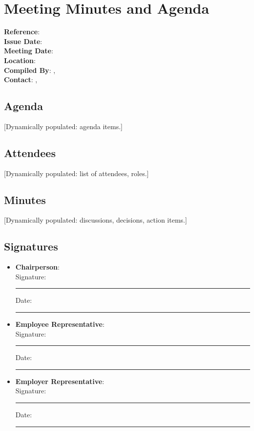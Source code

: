 \documentclass[11pt]{article}
\newcommand{\docTitle}{Meeting Minutes and Agenda}
\newcommand{\refNumber}{}
\newcommand{\issueDate}{}
\newcommand{\meetingDate}{}
\newcommand{\meetingLocation}{}
\newcommand{\compilerName}{}
\newcommand{\compilerRole}{}
\newcommand{\compilerEmail}{}
\newcommand{\compilerPhone}{}
\newcommand{\chairpersonName}{}
\newcommand{\employeeRepName}{}
\newcommand{\employerRepName}{}
\begin{document}
\section*{\docTitle}
\textbf{Reference}: \refNumber \\
\textbf{Issue Date}: \issueDate \\
\textbf{Meeting Date}: \meetingDate \\
\textbf{Location}: \meetingLocation \\
\textbf{Compiled By}: \compilerName, \compilerRole \\
\textbf{Contact}: \compilerEmail, \compilerPhone

\subsection*{Agenda}
[Dynamically populated: agenda items.]

\subsection*{Attendees}
[Dynamically populated: list of attendees, roles.]

\subsection*{Minutes}
[Dynamically populated: discussions, decisions, action items.]

\subsection*{Signatures}
\begin{itemize}
  \item \textbf{Chairperson}: \chairpersonName \\
    Signature: \rule{5cm}{0.4pt} \quad Date: \rule{3cm}{0.4pt}
  \item \textbf{Employee Representative}: \employeeRepName \\
    Signature: \rule{5cm}{0.4pt} \quad Date: \rule{3cm}{0.4pt}
  \item \textbf{Employer Representative}: \employerRepName \\
    Signature: \rule{5cm}{0.4pt} \quad Date: \rule{3cm}{0.4pt}
\end{itemize}
\end{document}
